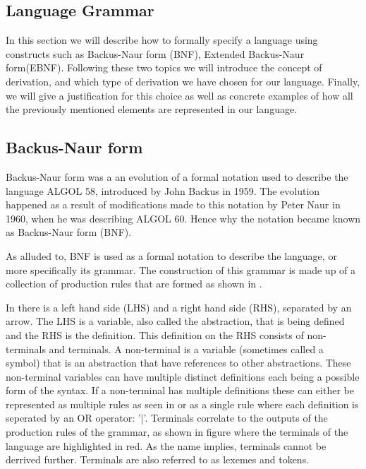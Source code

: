 \subsection{Language Grammar} \label{langGram}

In this section we will describe how to formally specify a language using constructs such as Backus-Naur form (BNF), Extended Backus-Naur form(EBNF).
Following these two topics we will introduce the concept of derivation, and which type of derivation we have chosen for our language. 
Finally, we will give a justification for this choice as well as concrete examples of how all the previously mentioned elements are represented in our language.

\subsection{Backus-Naur form}

Backus-Naur form was a an evolution of a formal notation used to describe the language ALGOL 58, introduced by John Backus in 1959. The evolution happened as a result of modifications
made to this notation by Peter Naur in 1960, when he was describing ALGOL 60. Hence why the notation became known as Backus-Naur form (BNF)\cite{sebesta_concepts_2016}. 

As alluded to, BNF is used as a formal notation to describe the language, or more specifically its grammar. 
The construction of this grammar is made up of a collection of production rules that are formed as shown in .


In  there is a left hand side (LHS) and a right hand side (RHS), separated by an arrow. The LHS is a variable, also called the abstraction, that is being defined and the RHS is the definition.
This definition on the RHS consists of non-terminals and terminals. A non-terminal is a variable (sometimes called a symbol) that is an abstraction that have references to other abstractions. 
These non-terminal variables can have multiple distinct definitions each being a possible form of the syntax. 
If a non-terminal has multiple definitions these can either be represented as multiple rules as seen in  or as a single rule where each definition is seperated by an OR operator: '|'. 
Terminals correlate to the outputs of the production rules of the grammar, as shown in figure  where the terminals of the language are highlighted in red. 
As the name implies, terminals cannot be derrived further. Terminals are also referred to as lexemes and tokens\cite{sebesta_concepts_2016}. 

